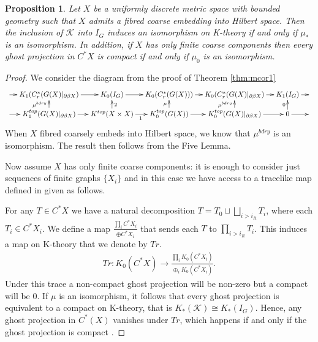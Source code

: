 \documentclass[11pt]{amsart}
\theoremstyle{plain}
\newtheorem{proposition}[theorem]{Proposition}%
\theoremstyle{definition}%
\theoremstyle{remark}%
\begin{document}
{\begin{proposition}\label{thm:MT2}
Let $X$ be a uniformly discrete metric space with bounded geometry such that $X$ admits a fibred coarse embedding into Hilbert space. Then the inclusion of $\mathcal{K}$ into $I_{G}$ induces an isomorphism on K-theory if and only if $\mu_{*}$ is an isomorphism. In addition, if $X$ has only finite coarse components then every ghost projection in $C^{*}X$ is compact if and only if $\mu_{0}$ is an isomorphism.
\end{proposition}
\begin{proof}
We consider the diagram from the proof of Theorem \ref{thm:mcor1}
$$
\xymatrix@=1em{
\ar[r] & K_{1}(C^{*}_{r}(G(X)|_{\partial\beta X}) \ar[r] & K_{0}(I_{G}) \ar[r]& K_{0}(C^{*}_{r}(G(X))) \ar[r]& K_{0}(C^{*}_{r}(G(X)|_{\partial\beta X})\ar[r] & K_{1}(I_{G}) \ar[r] & \\
\ar[r] & K_{1}^{top}(G(X)|_{\partial\beta X}) \ar[r] \ar[u]^{\mu^{bdry}}& K^{top}(X \times X) \ar[r]_{1}\ar[u]_{2}& K_{0}^{top}(G(X)) \ar[r]\ar[u]^{\mu}& K_{0}^{top}(G(X)|_{\partial\beta X}) \ar[r]\ar[u]^{\mu^{bdry}}& 0\ar[u]^{0} \ar[r] &
}
$$
When $X$ fibred coarsely embeds into Hilbert space, we know that $\mu^{bdry}$ is an isomorphism. The result then follows from the Five Lemma.

Now assume $X$ has only finite coarse components: it is enough to consider just sequences of finite graphs $\lbrace X_{i}\rbrace$ and in this case we have access to a tracelike map defined in \cite{higsonpreprint, explg1} given as follows.

For any $T \in C^{*}X$ we have a natural decomposition $T= T_{0} \sqcup \bigsqcup_{i>i_{R}}T_{i}$, where each $T_{i} \in C^{*}X_{i}$. We define a map $\frac{\prod_{i}C^{*}X_{i}}{\oplus C^{*}X_{i}}$ that sends each $T$ to $\prod_{i>i_{R}} T_{i}$. This induces a map on K-theory that we denote by $Tr$.
\begin{eqnarray*}
Tr:K_{0}(C^{*}X) \rightarrow \frac{\prod_{i}K_{0}(C^{*}X_{i})}{\oplus_{i}K_{0}(C^{*}X_{i})}.
\end{eqnarray*}
Under this trace a non-compact ghost projection will be non-zero but a compact will be $0$. If $\mu$ is an isomorphism, it follows that every ghost projection is equivalent to a compact on K-theory, that is $K_{*}(\mathcal{K}) \cong K_{*}(I_{G})$. Hence, any ghost projection in $C^{*}(X)$ vanishes under $Tr$, which happens if and only if the ghost projection is compact \cite{explg1}.
\end{proof}

}
\end{document}
